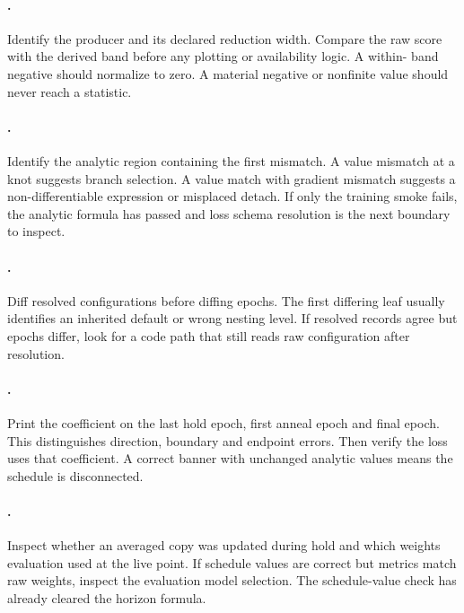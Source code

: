 \paragraph{.}
Identify the producer and its declared reduction width.  Compare the raw score
with the derived band before any plotting or availability logic.  A within-
band negative should normalize to zero.  A material negative or nonfinite
value should never reach a statistic.

\paragraph{.}
Identify the analytic region containing the first mismatch.  A value mismatch
at a knot suggests branch selection.  A value match with gradient mismatch
suggests a non-differentiable expression or misplaced detach.  If only the
training smoke fails, the analytic formula has passed and loss schema
resolution is the next boundary to inspect.

\paragraph{.}
Diff resolved configurations before diffing epochs.  The first differing leaf
usually identifies an inherited default or wrong nesting level.  If resolved
records agree but epochs differ, look for a code path that still reads raw
configuration after resolution.

\paragraph{.}
Print the coefficient on the last hold epoch, first anneal epoch and final
epoch.  This distinguishes direction, boundary and endpoint errors.  Then
verify the loss uses that coefficient.  A correct banner with unchanged
analytic values means the schedule is disconnected.

\paragraph{.}
Inspect whether an averaged copy was updated during hold and which weights
evaluation used at the live point.  If schedule values are correct but metrics
match raw weights, inspect the evaluation model selection.  The schedule-value
check has already cleared the horizon formula.

